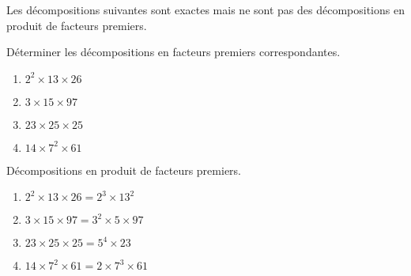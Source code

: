 \begin{exercice*}
    Les décompositions suivantes sont exactes mais ne sont pas des décompositions en produit de facteurs
    premiers.

    Déterminer les décompositions en facteurs premiers correspondantes.    
    \begin{enumerate}
        \item $2^2\times 13\times 26$
        \item $3\times 15\times 97$
        \item $23\times 25\times 25$
        \item $14\times 7^2\times 61$
    \end{enumerate}
\end{exercice*}
\begin{corrige}
    Décompositions en produit de facteurs premiers.
    
    \begin{enumerate}
        \item $2^2\times 13\times 26=2^3\times 13^2$
        \item $3\times 15\times 97=3^2\times 5\times 97$
        \item $23\times 25\times 25=5^4\times 23$
        \item $14\times 7^2\times 61=2\times 7^3\times 61$
    \end{enumerate}
\end{corrige}

